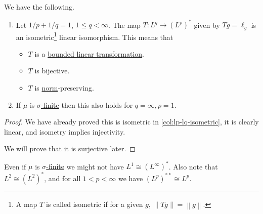 \begin{theorem}
	We have the following.
	\begin{enumerate}[(1)]
		\item Let \(1/p + 1/q = 1\), \(1 \leq q < \infty\). The map \(T \colon L^q \to (L^p)^\ast\) given by \(Tg = \ell_g\) is an isometric\footnote{A map \(T\) is called isometric if for a given \(g\), \(\left\lVert Tg\right\rVert = \left\lVert g\right\rVert \).}
		      linear isomorphism. This means that
		      \begin{itemize}
			      \item \(T\) is a \hyperref[def:bounded-linear-transformation]{bounded linear transformation}.
			      \item \(T\) is bijective.
			      \item \(T\) is \hyperref[def:norm]{norm}-preserving.
		      \end{itemize}
		\item If \(\mu\) is \hyperref[def:sigma-finite-measure]{\(\sigma\)-finite} then this also holds for \(q = \infty, p = 1\).
	\end{enumerate}
\end{theorem}
\begin{proof}
	We have already proved this is isometric in \autoref{col:lp-lq-isometric}, it is clearly linear, and isometry implies injectivity.

	We will prove that it is surjective later.
\end{proof}
\begin{note}
	Even if \(\mu\) is \hyperref[def:sigma-finite-measure]{\(\sigma\)-finite} we might not have \(L^1 \cong (L^\infty)^\ast\).
	Also note that \(L^2 \cong (L^2)^\ast\), and for all \(1 < p < \infty\) we have \((L^p)^{\ast\ast} \cong L^p\).
\end{note}
